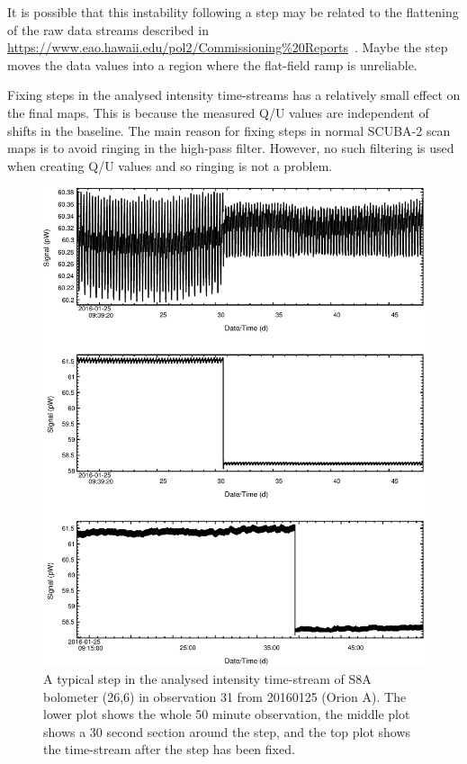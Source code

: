 \documentclass[twoside,11pt]{starlink}
\begin{document}
It is possible that this instability following a step may be related to
the flattening of the raw data streams described in
\url{https://www.eao.hawaii.edu/pol2/Commissioning%20Reports}~.
Maybe the step moves the data values into a region where the flat-field
ramp is unreliable.

Fixing steps in the analysed intensity time-streams has a relatively
small effect on the final maps. This is because the measured Q/U values
are independent of shifts in the baseline. The main reason for fixing
steps in normal SCUBA-2 scan maps is to avoid ringing in the high-pass
filter. However, no such filtering is used when creating Q/U values and
so ringing is not a problem.

\begin{figure}
\includegraphics[width=\columnwidth]{steps1}
\caption{A typical step in the analysed intensity time-stream of S8A bolometer
(26,6) in observation 31 from 20160125 (Orion A). The lower plot shows
the whole 50 minute observation, the middle plot shows a 30 second
section around the step, and the top plot shows the time-stream after the
step has been fixed.}
\label{fig:steps1}
\end{figure}
\end{document}
